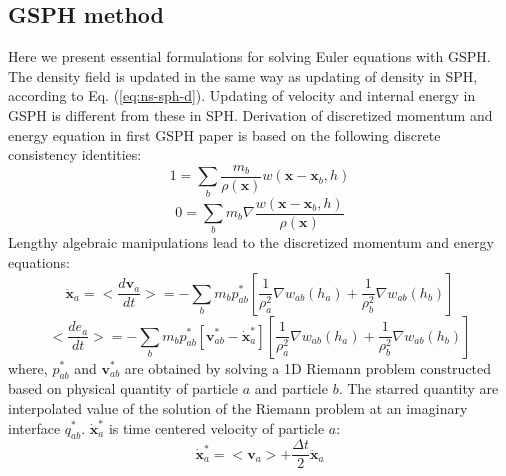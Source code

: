 \documentclass[review]{elsarticle}
\begin{document}
\subsection{GSPH method}
Here we present essential formulations for solving Euler equations with GSPH. The density field is updated in the same way as updating of density in SPH, according to Eq. (\ref{eq:ns-sph-d}). Updating of velocity and internal energy in GSPH is different from these in SPH. 
Derivation of discretized momentum and energy equation in first GSPH paper \citep{inutsuka2002reformulation} is based on the following discrete consistency identities: 
\begin{equation}
1=\sum_{b} \frac{m_{b}}{\rho(\textbf{x})}w(\textbf{x} - \textbf{x}_{b}, h)
\label{eq:GSPH-basic1}
\end{equation}
\begin{equation}
0=\sum_{b} m_{b} \nabla \frac{w(\textbf{x} - \textbf{x}_{b}, h)}{\rho(\textbf{x})}
\label{eq:GSPH-basic2}
\end{equation}
Lengthy algebraic manipulations \citep{inutsuka2002reformulation,iwasaki2011smoothed} lead to the discretized momentum and energy equations:
\begin{equation}
\ddot{\textbf{x}}_{a} = <\dfrac{d \textbf{v}_{a}}{dt}>= -\sum_{b} m_{b} p_{a b}^{\ast} \left[\frac{1}{\rho_{a}^2} \nabla w_{a b}(h_{a}) + \frac{1}{\rho_{b}^2} \nabla w_{a b}(h_{b}) \right]
\label{eq:gov-gsph-v-simple-form}
\end{equation}
\begin{equation}
<\dfrac{d e_{a}}{dt}>= - \sum_{b} m_{b} p_{a b}^{\ast} [\textbf{v}_{a b}^{\ast} - \dot{\textbf{x}}_{a}^{\ast}] \left[\frac{1}{\rho_{a}^2} \nabla w_{a b}(h_{a}) + \frac{1}{\rho_{b}^2} \nabla w_{a b}(h_{b}) \right]
\label{eq:gov-gsph-e-simple-form}
\end{equation}
where, $p_{a b}^{\ast}$ and $\textbf{v}_{a b}^{\ast}$ are obtained by solving a 1D Riemann problem constructed based on physical quantity of particle $a$ and particle $b$. The starred quantity  are interpolated value of the solution of the Riemann problem at an imaginary interface $q^{\ast}_{ab}$.
$\dot{\textbf{x}}_{a}^{\ast}$ is time centered velocity of particle $a$:
\begin{equation}
\dot{\textbf{x}}_{a}^{\ast} = <\textbf{v}_{a}> + \frac{\Delta t}{2} \ddot{\textbf{x}}_{a}
\end{equation}
\end{document}

